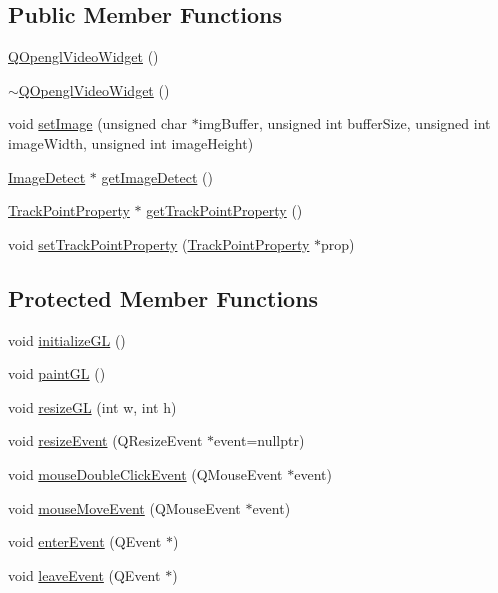 \subsection*{Public Member Functions}
\begin{DoxyCompactItemize}
\item 
\mbox{\hyperlink{class_q_opengl_video_widget_a55029786e1e6efafddc48743b37553e3}{Q\+Opengl\+Video\+Widget}} ()
\item 
\mbox{\hyperlink{class_q_opengl_video_widget_a6ad850569c0b4dc54d73de589ace82e9}{$\sim$\+Q\+Opengl\+Video\+Widget}} ()
\item 
void \mbox{\hyperlink{class_q_opengl_video_widget_a9534a70d67f329c85b623f6f708c08ba}{set\+Image}} (unsigned char $\ast$img\+Buffer, unsigned int buffer\+Size, unsigned int image\+Width, unsigned int image\+Height)
\item 
\mbox{\hyperlink{class_image_detect}{Image\+Detect}} $\ast$ \mbox{\hyperlink{class_q_opengl_video_widget_ab256cefe1bb2e4790f1c7d4c1989b12e}{get\+Image\+Detect}} ()
\item 
\mbox{\hyperlink{struct_track_point_property}{Track\+Point\+Property}} $\ast$ \mbox{\hyperlink{class_q_opengl_video_widget_ae028c3ff76eb983d0222ec2c0a6b4cfb}{get\+Track\+Point\+Property}} ()
\item 
void \mbox{\hyperlink{class_q_opengl_video_widget_a66fe89ddc0d8ba4600320dd00bb5ddee}{set\+Track\+Point\+Property}} (\mbox{\hyperlink{struct_track_point_property}{Track\+Point\+Property}} $\ast$prop)
\end{DoxyCompactItemize}
\subsection*{Protected Member Functions}
\begin{DoxyCompactItemize}
\item 
void \mbox{\hyperlink{class_q_opengl_video_widget_a35d303070fbebce4bb907ccbcfb6059c}{initialize\+GL}} ()
\item 
void \mbox{\hyperlink{class_q_opengl_video_widget_af99c251dee6be9884bf0284156272208}{paint\+GL}} ()
\item 
void \mbox{\hyperlink{class_q_opengl_video_widget_a807f6872097233a3d7b573317bcca3c3}{resize\+GL}} (int w, int h)
\item 
void \mbox{\hyperlink{class_q_opengl_video_widget_a11e8a8b01accae096650fd79ef49a1c6}{resize\+Event}} (Q\+Resize\+Event $\ast$event=nullptr)
\item 
void \mbox{\hyperlink{class_q_opengl_video_widget_ad38b0422d0b45ec7af1cd0327925c6d4}{mouse\+Double\+Click\+Event}} (Q\+Mouse\+Event $\ast$event)
\item 
void \mbox{\hyperlink{class_q_opengl_video_widget_a3498bcce428d78238d1b101850c0db52}{mouse\+Move\+Event}} (Q\+Mouse\+Event $\ast$event)
\item 
void \mbox{\hyperlink{class_q_opengl_video_widget_a7742313ffd8e43af717677a630563451}{enter\+Event}} (Q\+Event $\ast$)
\item 
void \mbox{\hyperlink{class_q_opengl_video_widget_afd181aad471752131da2bcb37cf3abc3}{leave\+Event}} (Q\+Event $\ast$)
\end{DoxyCompactItemize}


